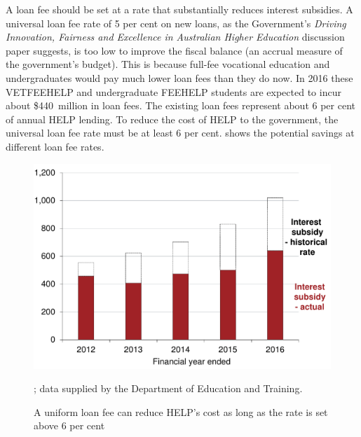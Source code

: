 \documentclass[embargoed]{grattan}
\begin{document}
A loan fee should be set at a rate that substantially reduces interest subsidies.
A universal loan fee rate of 5 per cent on new loans, as the Government's \emph{Driving Innovation, Fairness and Excellence in Australian Higher Education} discussion paper suggests, is too low to improve the fiscal balance (an accrual measure of the government's budget).
This is because full-fee vocational education and undergraduates would pay much lower loan fees than they do now.
In 2016 these \gls{VETFEEHELP} and undergraduate \gls{FEEHELP} students are expected to incur about \$440~million in loan fees.
The existing loan fees represent about 6 per cent of annual \gls{HELP} lending.
To reduce the cost of \gls{HELP} to the government, the universal loan fee rate must be at least 6 per cent.
 shows the potential savings at different loan fee rates.

\begin{figure}
\caption[A uniform loan fee can reduce {HELP}'s cost as long as the rate is set above 6 per cent]{A uniform loan fee can reduce \gls{HELP}'s cost as long as the rate is set above 6 per cent}\label{fig:fig20-uniform-loan-fee-can-reduce-HELPs-cost-as-long-as-the-rate-is-set-above-6pc}

\includegraphics[page=20]{atlas/Chartpack.pdf}

%
{\textcites[][Table~57]{Education2015Highereducationreport}[][15]{Ryan2016RedesigningVETFEE}{Birmingham2016MediareleaseNew}; data supplied by the Department of Education and Training.}
\end{figure}
\end{document}
